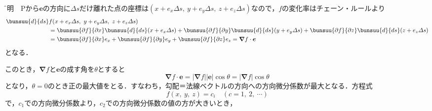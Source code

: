 \f{証明}　$\mathrm{P}$から$\bm{e}$の方向に$\varDelta s$だけ離れた点の座標は$(x + e_x \varDelta s,\ y + e_y \varDelta s,\ z + e_z \varDelta s)$なので，$f$の変化率はチェーン・ルールより
\begin{align*}
	\bunsuu{d}{ds}&f(x + e_x \varDelta s,\ y + e_y \varDelta s,\ z + e_z \varDelta s)\\
	&= \bunsuu{\partial f}{\partial x}\bunsuu{d}{ds}(x + e_x \varDelta s) + \bunsuu{\partial f}{\partial y}\bunsuu{d}{ds}(y + e_y \varDelta s) + \bunsuu{\partial f}{\partial z}\bunsuu{d}{ds}(z + e_z \varDelta s)\\
	&= \bunsuu{\partial f}{\partial x}e_x + \bunsuu{\partial f}{\partial y}e_y + \bunsuu{\partial f}{\partial z}e_z = \bm{\nabla}f \cdot \bm{e}
\end{align*}
となる．

このとき，$\bm{\nabla}f$と$\bm{e}$の成す角を$\theta$とすると
\begin{equation*}
	\bm{\nabla}f \cdot \bm{e} = |\bm{\nabla} f||\bm{e}|\cos\theta = |\bm{\nabla}f|\cos\theta
\end{equation*}
となり，$\theta = 0$のとき正の最大値をとる．すなわち，勾配＝法線ベクトルの方向への方向微分係数が最大となる．方程式
\begin{equation*}
	f(x,\ y,\ z) = c_i \quad (c = 1,\ 2,\ \cdots)
\end{equation*}
で，$c_1$での方向微分係数より，$c_2$での方向微分係数の値の方が大きいとき，